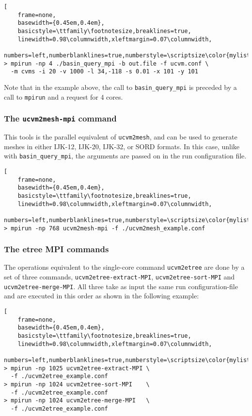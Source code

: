 \begin{lstlisting}[
	frame=none,
	basewidth={0.45em,0.4em},
	basicstyle=\ttfamily\footnotesize,breaklines=true,
	linewidth=0.98\columnwidth,xleftmargin=0.07\columnwidth,
	numbers=left,numberblanklines=true,numberstyle=\scriptsize\color{mylistingnclr}]
> mpirun -np 4 ./basin_query_mpi -b out.file -f ucvm.conf \
  -m cvms -i 20 -v 1000 -l 34,-118 -s 0.01 -x 101 -y 101
\end{lstlisting}

Note that in the example above, the call to \texttt{basin\_query\_mpi} is preceded by a call to \texttt{mpirun} and a request for 4 cores.

\subsubsection{The \textup{\texttt{ucvm2mesh-mpi}} command}

This tools is the parallel equivalent of \texttt{ucvm2mesh}, and can be used to generate meshes in either IJK-12, IJK-20, IJK-32, or SORD formats. In this case, unlike with \texttt{basin\_query\_mpi}, the arguments are passed on in the run configuration file.

\begin{lstlisting}[
	frame=none,
	basewidth={0.45em,0.4em},
	basicstyle=\ttfamily\footnotesize,breaklines=true,
	linewidth=0.98\columnwidth,xleftmargin=0.07\columnwidth,
	numbers=left,numberblanklines=true,numberstyle=\scriptsize\color{mylistingnclr}]
> mpirun -np 768 ucvm2mesh-mpi -f ./ucvm2mesh_example.conf
\end{lstlisting}

\subsubsection{The etree MPI commands}

The operations equivalent to the single-core command \texttt{ucvm2etree} are done by a set of three commands, \texttt{ucvm2etree-extract-MPI}, \texttt{ucvm2etree-sort-MPI} and \texttt{ucvm2etree-merge-MPI}. All three take as input the same run configuration-file and are executed in this order as shown in the following example:

\begin{lstlisting}[
	frame=none,
	basewidth={0.45em,0.4em},
	basicstyle=\ttfamily\footnotesize,breaklines=true,
	linewidth=0.98\columnwidth,xleftmargin=0.07\columnwidth,
	numbers=left,numberblanklines=true,numberstyle=\scriptsize\color{mylistingnclr}]
> mpirun -np 1025 ucvm2etree-extract-MPI \
  -f ./ucvm2etree_example.conf
> mpirun -np 1024 ucvm2etree-sort-MPI    \
  -f ./ucvm2etree_example.conf
> mpirun -np 1024 ucvm2etree-merge-MPI   \
  -f ./ucvm2etree_example.conf
\end{lstlisting}

